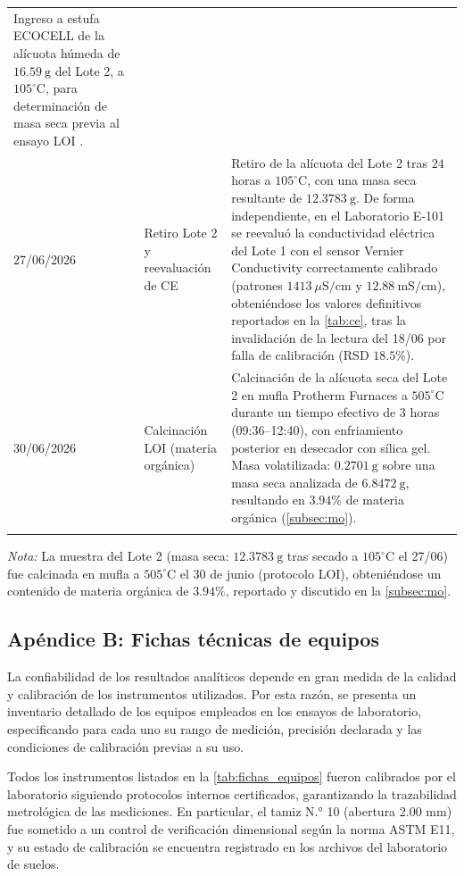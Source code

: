 \documentclass[fleqn]{jaes}
\begin{document}
\begin{table}[!htb]
\begin{tabular}{@{}p{1.9cm}p{3.9cm}p{10.6cm}@{}}
Ingreso a estufa ECOCELL de la alícuota húmeda de $16.59~\text{g}$ del Lote 2, a $105^{\circ}\text{C}$, para determinación de masa seca previa al ensayo LOI \cite{INACAL2019}. \\
27/06/2026 &
Retiro Lote 2 y reevaluación de CE &
Retiro de la alícuota del Lote 2 tras $24$ horas a $105^{\circ}\text{C}$, con una masa seca resultante de $12.3783~\text{g}$. De forma independiente, en el Laboratorio E-101 se reevaluó la conductividad eléctrica del Lote 1 con el sensor Vernier Conductivity correctamente calibrado (patrones $1413~\mu\text{S/cm}$ y $12.88~\text{mS/cm}$), obteniéndose los valores definitivos reportados en la \cref{tab:ce}, tras la invalidación de la lectura del 18/06 por falla de calibración (RSD $18.5\%$). \\
30/06/2026 &
Calcinación LOI (materia orgánica) &
Calcinación de la alícuota seca del Lote 2 en mufla Protherm Furnaces a $505^{\circ}\text{C}$ durante un tiempo efectivo de $3$ horas (09:36--12:40), con enfriamiento posterior en desecador con sílica gel. Masa volatilizada: $0.2701~\text{g}$ sobre una masa seca analizada de $6.8472~\text{g}$, resultando en $3.94\%$ de materia orgánica (\cref{subsec:mo}). \\
\botrule
\end{tabular}
\end{table}

\textit{Nota:} La muestra del Lote 2 (masa seca: $12.3783~\text{g}$ tras secado a $105^\circ\text{C}$ el 27/06) fue calcinada en mufla a $505^\circ\text{C}$ el 30 de junio (protocolo LOI), obteniéndose un contenido de materia orgánica de $3.94\%$, reportado y discutido en la \cref{subsec:mo}.

\subsection{Apéndice B: Fichas técnicas de equipos}
\label{sec:apendiceB}

La confiabilidad de los resultados analíticos depende en gran medida de la calidad y calibración de los instrumentos utilizados. Por esta razón, se presenta un inventario detallado de los equipos empleados en los ensayos de laboratorio, especificando para cada uno su rango de medición, precisión declarada y las condiciones de calibración previas a su uso.

Todos los instrumentos listados en la \cref{tab:fichas_equipos} fueron calibrados por el laboratorio siguiendo protocolos internos certificados, garantizando la trazabilidad metrológica de las mediciones. En particular, el tamiz N.° 10 (abertura 2.00 mm) fue sometido a un control de verificación dimensional según la norma ASTM E11, y su estado de calibración se encuentra registrado en los archivos del laboratorio de suelos.
\end{document}
